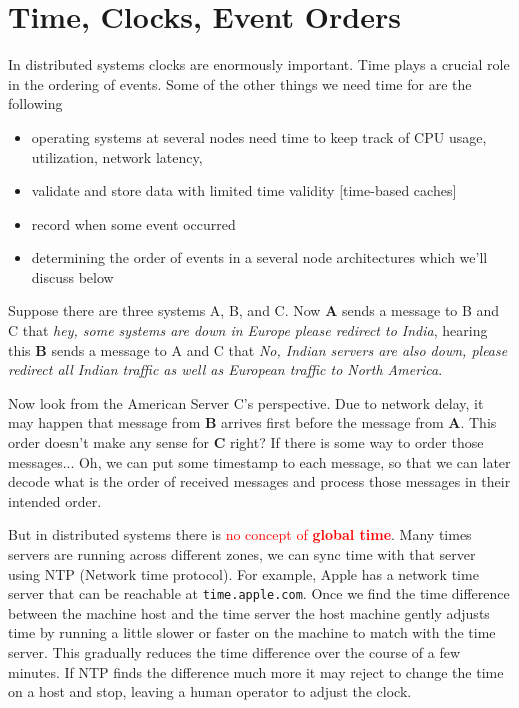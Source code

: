 \section{Time, Clocks, Event Orders}
In distributed systems clocks are enormously important. Time plays a crucial role in the ordering of events. Some of the other things we need time for are the following

\begin{itemize}
    \item operating systems at several nodes need time to keep track of CPU usage, utilization, network latency,
    \item validate and store data with limited time validity [time-based caches]
    \item record when some event occurred
    \item determining the order of events in a several node architectures which we'll discuss below
\end{itemize}

Suppose there are three systems A, B, and C. Now \textbf{A} sends a message to B and C that \textit{hey, some systems are down in Europe please redirect to India}, hearing this \textbf{B} sends a message to A and C that \textit{No, Indian servers are also down, please redirect all Indian traffic as well as European traffic to North America}.

\noindent Now look from the American Server C's perspective. Due to network delay, it may happen that message from \textbf{B} arrives first before the message from \textbf{A}. This order doesn't make any sense for \textbf{C} right? If there is some way to order those messages... Oh, we can put some timestamp to each message, so that we can later decode what is the order of received messages and process those messages in their intended order.

\noindent But in distributed systems there is \textcolor{red}{no concept of \textbf{global time}}. Many times servers are running across different zones, we can sync time with that server using NTP (Network time protocol). For example, Apple has a network time server that can be reachable at \texttt{time.apple.com}. Once we find the time difference between the machine host and the time server the host machine gently adjusts time by running a little slower or faster on the machine to match with the time server. This gradually reduces the time difference over the course of a few minutes. If NTP finds the difference much more it may reject to change the time on a host and stop, leaving a human operator to adjust the clock.

